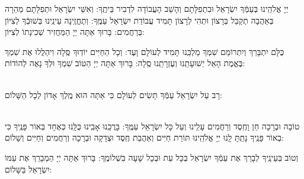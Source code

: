 \documentclass[twoside, openany, parskip=half, 11pt]{book}
\begin{document}
 יְיָ אֱלֹהֵֽינוּ בְּעַמְּֿךָ יִשְׂרָאֵל וּבִתְפִלָּתָם וְהָשֵׁב הָעֲבוֹדָה לִדְבִיר בֵּיתֶֽךָ: וְאִשֵּׁי יִשְׂרָאֵל וּתְפִלָּתָם מְהֵרָה בְּאַהֲבָה תְקַבֵּל בְּרָצוֹן וּתְהִי לְרָצוֹן תָּמִיד עֲבוֹדַת יִשְׂרָאֵל עַמֶּֽךָ: וְתֶחֱזֶֽינָה עֵינֵֽינוּ בְּשׁוּבְֿךָ לְצִיּוֹן בְּרַחֲמִים: בָּרוּךְ אַתָּה יְיָ הַמַּחֲזִיר שְׁכִינָתוֹ לְצִיּוֹן:

\modim

 כֻּלָּם יִתְבָּרַךְ וְיִתְרוֹמַם שִׁמְךָ מַלְכֵּֽנוּ תָּמִיד לְעוֹלָם וָעֶד: וְכָל הַחַיִּים יוֹדֽוּךָ סֶּֽלָה וִיהַלֲלוּ אֶת שִׁמְךָ בֶּאֱמֶת הָאֵל יְשׁוּעָתֵֽנוּ וְעֶזְרָתֵֽנוּ סֶֽלָה: בָּרוּךְ אַתָּה יְיָ הַטּוֹב שִׁמְךָ וּלְךָ נָאֶה לְהוֹדוֹת:







\begin{paracol}{2}

\\
 רָב עַל יִשְׂרָאֵל עַמְּֿךָ תָּשִׂים לְעוֹלָם כִּי אַתָּה הוּא מֶֽלֶךְ אָדוֹן לְכָל הַשָּׁלוֹם:

\switchcolumn


\begin{small}
\\
 טוֹבָה וּבְרָכָה חֵן וָחֶֽסֶד וְרַחֲמִים עָלֵֽינוּ וְעַל כָּל יִשְׂרָאֵל עַמֶּֽךָ: בָּרֲכֵֽנוּ אָבִֽינוּ כֻּלָּֽנוּ כְּאֶחָד בְּאוֹר פָּנֶֽיךָ כִּי בְאוֹר פָּנֶֽיךָ נָתַֽתָּ לָֽנוּ יְיָ אֱלֹהֵֽינוּ תּוֹרַת חַיִּים וְאַהֲבַת חֶֽסֶד וּצְדָקָה וּבְרָכָה וְרַחֲמִים וְחַיִּים וְשָׁלוֹם:

\end{small}


\end{paracol}
 וְטוֹב בְּעֵינֶֽיךָ לְבָרֵךְ אֶת עַמְּֿךָ יִשְׂרָאֵל בְּכָל עֵת וּבְכָל שָׁעָה בִּשְׁלוֹמֶֽךָ: בָּרוּךְ אַתָּה יְיָ הַמְבָרֵךְ אֶת עַמּוֹ יִשְׂרָאֵל בַּשָּׁלוֹם:

\tachanunim


\vfill

\end{document}
